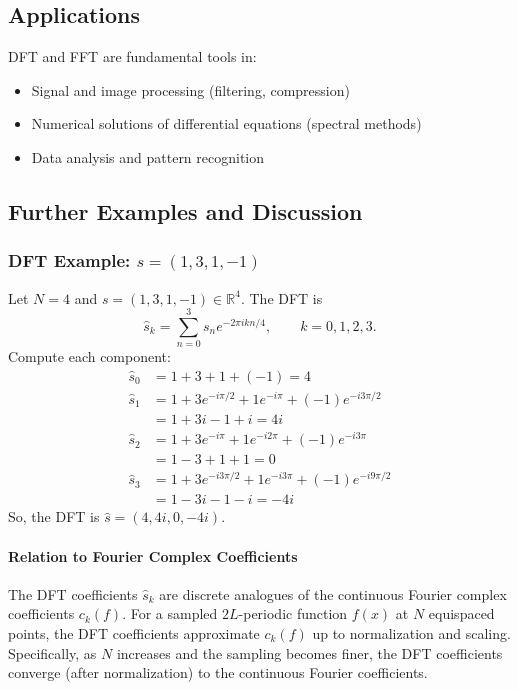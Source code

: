 \subsection{Applications}
DFT and FFT are fundamental tools in:
\begin{itemize}
    \item Signal and image processing (filtering, compression)
    \item Numerical solutions of differential equations (spectral methods)
    \item Data analysis and pattern recognition
\end{itemize}

\subsection{Further Examples and Discussion}

\subsubsection*{DFT Example: $s = (1, 3, 1, -1)$}

Let $N = 4$ and $s = (1, 3, 1, -1) \in \mathbb{R}^4$. The DFT is
\[
    \hat{s}_k = \sum_{n=0}^{3} s_n e^{-2\pi i k n / 4}, \qquad k = 0,1,2,3.
\]
Compute each component:
\begin{align*}
    \hat{s}_0 & = 1 + 3 + 1 + (-1) = 4                                  \\
    \hat{s}_1 & = 1 + 3 e^{-i\pi/2} + 1 e^{-i\pi} + (-1) e^{-i3\pi/2}   \\
              & = 1 + 3i - 1 + i = 4i                                   \\
    \hat{s}_2 & = 1 + 3 e^{-i\pi} + 1 e^{-i2\pi} + (-1) e^{-i3\pi}      \\
              & = 1 - 3 + 1 + 1 = 0                                     \\
    \hat{s}_3 & = 1 + 3 e^{-i3\pi/2} + 1 e^{-i3\pi} + (-1) e^{-i9\pi/2} \\
              & = 1 - 3i - 1 - i = -4i
\end{align*}
So, the DFT is $\hat{s} = (4, 4i, 0, -4i)$.

\paragraph{Relation to Fourier Complex Coefficients}
The DFT coefficients $\hat{s}_k$ are discrete analogues of the continuous Fourier complex coefficients $c_k(f)$. For a sampled $2L$-periodic function $f(x)$ at $N$ equispaced points, the DFT coefficients approximate $c_k(f)$ up to normalization and scaling. Specifically, as $N$ increases and the sampling becomes finer, the DFT coefficients converge (after normalization) to the continuous Fourier coefficients.

